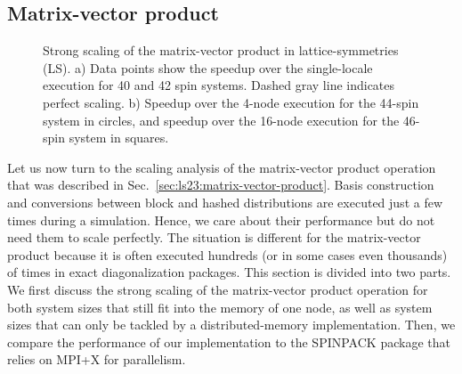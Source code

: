 \subsection{Matrix-vector product}


\begin{figure}[h]
    \centering%
    \hspace{-10pt}{Figure_8.pgf}%
    \vspace{-5pt}%
    \caption{Strong scaling of the matrix-vector product in lattice-symmetries (LS). a) Data points show the speedup over the single-locale execution for 40 and 42 spin systems. Dashed gray line indicates perfect scaling. b) Speedup over the 4-node execution for the 44-spin system in circles, and speedup over the 16-node execution for the 46-spin system in squares.}
    \label{fig:ls23:scaling-matrixVectorProduct}
\end{figure}

Let us now turn to the scaling analysis of the matrix-vector product operation that was described in Sec.~\ref{sec:ls23:matrix-vector-product}. Basis construction and conversions between block and hashed distributions are executed just a few times during a simulation. Hence, we care about their performance but do not need them to scale perfectly. The situation is different for the matrix-vector product because it is often executed hundreds (or in some cases even thousands) of times in exact diagonalization packages. This section is divided into two parts. We first discuss the strong scaling of the matrix-vector product operation for both system sizes that still fit into the memory of one node, as well as system sizes that can only be tackled by a distributed-memory implementation. Then, we compare the performance of our implementation to the SPINPACK package that relies on MPI+X for parallelism.

